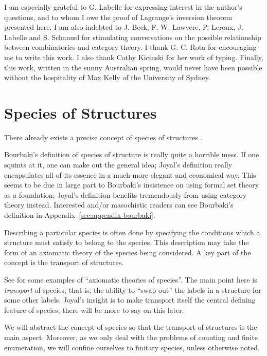 \documentclass{amsart}
\theoremstyle{definition}
\theoremstyle{remark}
\begin{document}
I am especially grateful to G. Labelle for expressing interest in the
author's questions, and to whom I owe the proof of Lagrange's
inversion theorem presented here. I am also indebted to J. Beck, F. W.
Lawvere, P. Leroux, J. Labelle and S. Schanuel for stimulating
conversations on the possible relationship between combinatorics and
category theory. I thank G. C. Rota for encouraging me to write this
work. I also thank Cathy Kicinski for her work of typing.  Finally,
this work, written in the sunny Australian spring, would never have
been possible without the hospitality of Max Kelly of the University
of Sydney.

\section{Species of Structures}
\label{sec:species-of-structures}

There already exists a precise concept of species of structures
\citep[Chap.\ 4]{bourbaki1968elements}.
\begin{commentary}
  Bourbaki's definition of species of structure is really quite a
  horrible mess.  If one squints at it, one can make out the general
  idea; Joyal's definition really encapsulates all of its essence in a
  much more elegant and economical way.  This seems to be due in large
  part to Bourbaki's insistence on using formal set theory as a
  foundation; Joyal's definition benefits tremendously from using
  category theory instead.  Interested and/or masochistic readers can
  see Bourbaki's definition in Appendix~\ref{sec:appendix-bourbaki}.
\end{commentary}
Describing a particular species is often done by specifying the
conditions which a structure must satisfy to belong to the species.
This description may take the form of an axiomatic theory of the
species being considered. A key part of the concept is the transport
of structures.
\begin{commentary}
  See \citet[pp. 6--7]{bll} for some examples of ``axiomatic theories
  of species''. The main point here is \emph{transport} of species,
  that is, the ability to ``swap out'' the labels in a structure for
  some other labels.  Joyal's insight is to make transport itself the
  central defining feature of species; there will be more to say on
  this later.
\end{commentary}
We will abstract the concept of species so that the transport of
structures is the main aspect. Moreover, as we only deal with the
problems of counting and finite enumeration, we will confine ourselves
to finitary species, unless otherwise noted.
\end{document}
